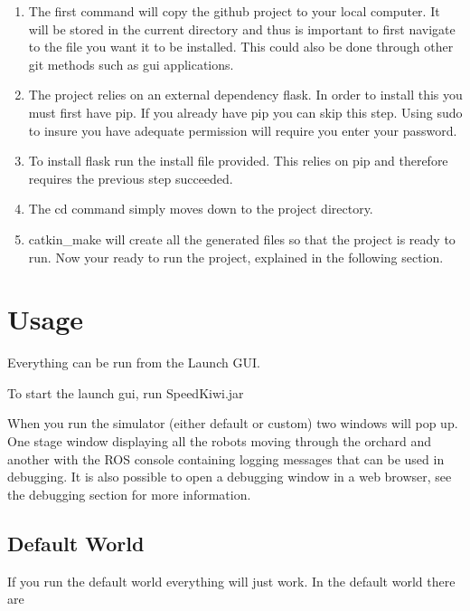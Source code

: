 \documentclass{article}
\begin{document}
\begin{enumerate}
\item The first command will copy the github project to your local computer. It will be stored in the current directory and thus is important to first navigate to the file you want it to be installed. This could also be done through other git methods such as gui applications.
\item The project relies on an external dependency flask. In order to install this you must first have pip. If you already have pip you can skip this step. Using sudo to insure you have adequate permission will require you enter your password.
\item To install flask run the install file provided. This relies on pip and therefore requires the previous step succeeded.
\item The cd command simply moves down to the project directory.
\item catkin\_make will create all the generated files so that the project is ready to run.
Now your ready to run the project, explained in the following section.
\end{enumerate}

\section{Usage}
Everything can be run from the Launch GUI.


To start the launch gui, run SpeedKiwi.jar

When you run the simulator (either default or custom) two windows will pop up. One stage window displaying all the robots moving through the orchard and another with the ROS console containing logging messages that can be used in debugging.
It is also possible to open a debugging window in a web browser, see the debugging section for more information.

\subsection{Default World}

If you run the default world everything will just work.
In the default world there are
\end{document}
